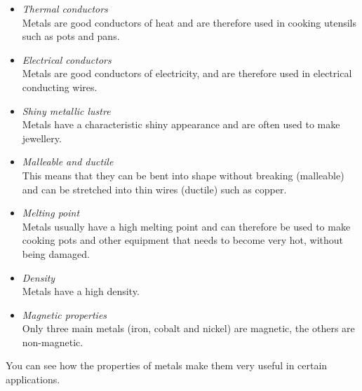         \label{m38708*id65732}\begin{itemize}[noitemsep]
            \label{m38708*uid77}\item \textsl{Thermal conductors} \\
Metals are good conductors of heat and are therefore used in cooking utensils such as pots and pans.
\label{m38708*uid78}\item \textsl{Electrical conductors} \\
Metals are good conductors of electricity, and are therefore used in electrical conducting wires.
\label{m38708*uid79}\item \textsl{Shiny metallic lustre} \\
Metals have a characteristic shiny appearance and are often used to make jewellery.
\label{m38708*uid80}\item \textsl{Malleable and ductile} \\
This means that they can be bent into shape without breaking (malleable) and can be stretched into thin wires (ductile) such as copper.
\label{m38708*uid81}\item \textsl{Melting point} \\
Metals usually have a high melting point and can therefore be used to make cooking pots and other equipment that needs to become very hot, without being damaged.
\label{m38708*uid82}\item \textsl{Density} \\
Metals have a high density.
\item \textsl{Magnetic properties} \\ 
Only three main metals (iron, cobalt and nickel) are magnetic, the others are non-magnetic.
\end{itemize}
         \label{m38708*id65852}You can see how the properties of metals make them very useful in certain applications.\par 
\label{m38708*secfhsst!!!underscore!!!id320} 
